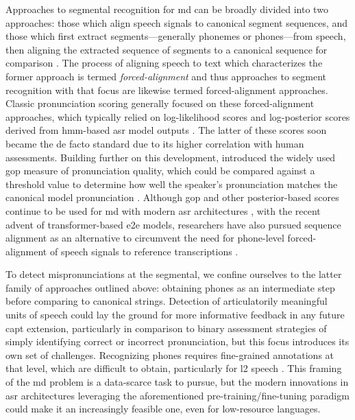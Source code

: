 \documentclass[thesis]{cluu}
\begin{document}
Approaches to segmental recognition for \gls{md} can be broadly divided into two approaches: those which align speech signals to canonical segment sequences, and those which first extract segments---generally phonemes or phones---from speech, then aligning the extracted sequence of segments to a canonical sequence for comparison \parencite{korzekwaComputerassistedPronunciationTraining2022}. The process of aligning speech to text which characterizes the former approach is termed \textit{forced-alignment} and thus approaches to segment recognition with that focus are likewise termed forced-alignment approaches. Classic pronunciation scoring generally focused on these forced-alignment approaches, which typically relied on log-likelihood scores and log-posterior scores derived from \gls{hmm}-based \gls{asr} model outputs \parencite{wittAutomaticErrorDetection}. The latter of these scores soon became the de facto standard due to its higher correlation with human assessments. Building further on this development, \textcite{witt2000use} introduced the widely used \gls{gop} measure of pronunciation quality, which could be compared against a threshold value to determine how well the speaker's pronunciation matches the canonical model pronunciation \parencite{witt2014computer}. Although \gls{gop} and other posterior-based scores continue to be used for \gls{md} with modern \gls{asr} architectures \parencite[inter alia]{parikhEvaluatingLogitBasedGOP2025,gongTransformerBasedMultiAspectMultiGranularity2022}, with the recent advent of transformer-based \gls{e2e} models, researchers have also pursued sequence alignment as an alternative to circumvent the need for phone-level forced-alignment of speech signals to reference transcriptions \parencite{loEffectiveEndtoEndModeling2020,leungCNNRNNCTCBasedEndtoend2019}. 

To detect mispronunciations at the segmental, we confine ourselves to the latter family of approaches outlined above: obtaining phones as an intermediate step before comparing to canonical strings. Detection of articulatorily meaningful units of speech could lay the ground for more informative feedback in any future \gls{capt} extension, particularly in comparison to binary assessment strategies of simply identifying correct or incorrect pronunciation, but this focus introduces its own set of challenges. Recognizing phones requires fine-grained annotations at that level, which are difficult to obtain, particularly for \gls{l2} speech \parencite{zhangL2GENNeuralPhoneme2022}. This framing of the \gls{md} problem is a data-scarce task to pursue, but the modern innovations in \gls{asr} architectures leveraging the aforementioned pre-training/fine-tuning paradigm could make it an increasingly feasible one, even for low-resource languages.
\end{document}
